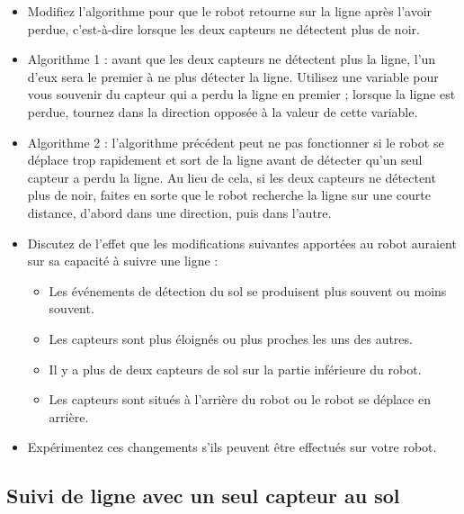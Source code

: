 {\begin{framed}
\begin{itemize}
\item Modifiez l'algorithme pour que le robot retourne sur la ligne après l'avoir perdue, c'est-à-dire lorsque les deux capteurs ne détectent plus de noir.
\item Algorithme 1 : avant que les deux capteurs ne détectent plus la ligne, l'un d'eux sera le premier à ne plus détecter la ligne. Utilisez une variable pour vous souvenir du capteur qui a perdu la ligne en premier ; lorsque la ligne est perdue, tournez dans la direction opposée à la valeur de cette variable.
\item Algorithme 2 : l'algorithme précédent peut ne pas fonctionner si le robot se déplace trop rapidement et sort de la ligne avant de détecter qu'un seul capteur a perdu la ligne. Au lieu de cela, si les deux capteurs ne détectent plus de noir, faites en sorte que le robot recherche la ligne sur une courte distance, d'abord dans une direction, puis dans l'autre.
\end{itemize}
\end{framed}

\begin{framed}
\begin{itemize}
\item Discutez de l'effet que les modifications suivantes apportées au robot auraient sur sa capacité à suivre une ligne :
\begin{itemize}
\item Les événements de détection du sol se produisent plus souvent ou moins souvent.
\item Les capteurs sont plus éloignés ou plus proches les uns des autres.
\item Il y a plus de deux capteurs de sol sur la partie inférieure du robot.
\item Les capteurs sont situés à l'arrière du robot ou le robot se déplace en arrière.
\end{itemize}
\item Expérimentez ces changements s'ils peuvent être effectués sur votre robot.
\end{itemize}
\end{framed}

\subsection{Suivi de ligne avec un seul capteur au sol}

}
